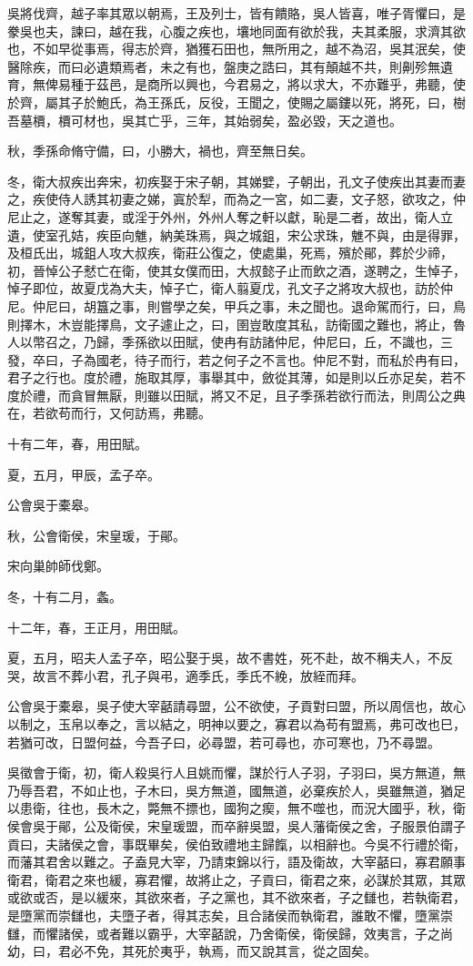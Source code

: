 \begin{pinyinscope}
吳將伐齊，越子率其眾以朝焉，王及列士，皆有饋賂，吳人皆喜，唯子胥懼曰，是豢吳也夫，諫曰，越在我，心腹之疾也，壤地同面有欲於我，夫其柔服，求濟其欲也，不如早從事焉，得志於齊，猶獲石田也，無所用之，越不為沼，吳其泯矣，使醫除疾，而曰必遺類焉者，未之有也，盤庚之誥曰，其有顛越不共，則劓殄無遺育，無俾易種于茲邑，是商所以興也，今君易之，將以求大，不亦難乎，弗聽，使於齊，屬其子於鮑氏，為王孫氏，反役，王聞之，使賜之屬鏤以死，將死，曰，樹吾墓檟，檟可材也，吳其亡乎，三年，其始弱矣，盈必毀，天之道也。

秋，季孫命脩守備，曰，小勝大，禍也，齊至無日矣。

冬，衛大叔疾出奔宋，初疾娶于宋子朝，其娣嬖，子朝出，孔文子使疾出其妻而妻之，疾使侍人誘其初妻之娣，寘於犁，而為之一宮，如二妻，文子怒，欲攻之，仲尼止之，遂奪其妻，或淫于外州，外州人奪之軒以獻，恥是二者，故出，衛人立遺，使室孔姞，疾臣向魋，納美珠焉，與之城鉏，宋公求珠，魋不與，由是得罪，及桓氏出，城鉏人攻大叔疾，衛莊公復之，使處巢，死焉，殯於鄖，葬於少禘，初，晉悼公子憖亡在衛，使其女僕而田，大叔懿子止而飲之酒，遂聘之，生悼子，悼子即位，故夏戊為大夫，悼子亡，衛人翦夏戊，孔文子之將攻大叔也，訪於仲尼。仲尼曰，胡簋之事，則嘗學之矣，甲兵之事，未之聞也。退命駕而行，曰，鳥則擇木，木豈能擇鳥，文子遽止之，曰，圉豈敢度其私，訪衛國之難也，將止，魯人以幣召之，乃歸，季孫欲以田賦，使冉有訪諸仲尼，仲尼曰，丘，不識也，三發，卒曰，子為國老，待子而行，若之何子之不言也。仲尼不對，而私於冉有曰，君子之行也。度於禮，施取其厚，事舉其中，斂從其薄，如是則以丘亦足矣，若不度於禮，而貪冒無厭，則雖以田賦，將又不足，且子季孫若欲行而法，則周公之典在，若欲苟而行，又何訪焉，弗聽。

十有二年，春，用田賦。

夏，五月，甲辰，孟子卒。

公會吳于橐皋。

秋，公會衛侯，宋皇瑗，于鄖。

宋向巢帥師伐鄭。

冬，十有二月，螽。

十二年，春，王正月，用田賦。

夏，五月，昭夫人孟子卒，昭公娶于吳，故不書姓，死不赴，故不稱夫人，不反哭，故言不葬小君，孔子與弔，適季氏，季氏不絻，放絰而拜。

公會吳于橐皋，吳子使大宰嚭請尋盟，公不欲使，子貢對曰盟，所以周信也，故心以制之，玉帛以奉之，言以結之，明神以要之，寡君以為苟有盟焉，弗可改也巳，若猶可改，日盟何益，今吾子曰，必尋盟，若可尋也，亦可寒也，乃不尋盟。

吳徵會于衛，初，衛人殺吳行人且姚而懼，謀於行人子羽，子羽曰，吳方無道，無乃辱吾君，不如止也，子木曰，吳方無道，國無道，必棄疾於人，吳雖無道，猶足以患衛，往也，長木之，斃無不摽也，國狗之瘈，無不噬也，而況大國乎，秋，衛侯會吳于鄖，公及衛侯，宋皇瑗盟，而卒辭吳盟，吳人藩衛侯之舍，子服景伯謂子貢曰，夫諸侯之會，事既畢矣，侯伯致禮地主歸餼，以相辭也。今吳不行禮於衛，而藩其君舍以難之。子盍見大宰，乃請束錦以行，語及衛故，大宰嚭曰，寡君願事衛君，衛君之來也緩，寡君懼，故將止之，子貢曰，衛君之來，必謀於其眾，其眾或欲或否，是以緩來，其欲來者，子之黨也，其不欲來者，子之讎也，若執衛君，是墮黨而崇讎也，夫墮子者，得其志矣，且合諸侯而執衛君，誰敢不懼，墮黨崇讎，而懼諸侯，或者難以霸乎，大宰嚭說，乃舍衛侯，衛侯歸，效夷言，子之尚幼，曰，君必不免，其死於夷乎，執焉，而又說其言，從之固矣。


\end{pinyinscope}
